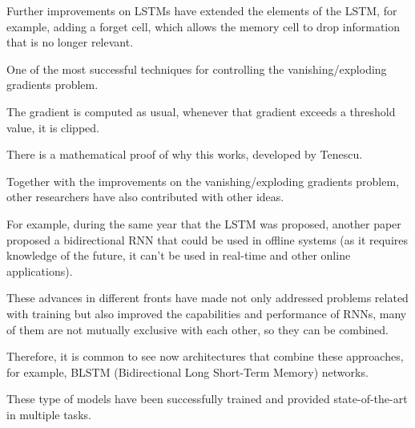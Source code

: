 Further improvements on LSTMs have extended the elements
of the LSTM, for example, adding a forget cell, which
allows the memory cell to drop information that is no
longer relevant.

 One of the most successful techniques for
controlling the vanishing/exploding gradients problem.

The gradient is computed as usual, whenever that gradient
exceeds a threshold value, it is clipped.

There is a mathematical proof of why this works, developed
by Tenescu.

 Together with the improvements on the
vanishing/exploding gradients problem, other researchers
have also contributed with other ideas.

For example, during the same year that the LSTM was
proposed, another paper proposed a bidirectional RNN that
could be used in offline systems (as it requires knowledge
of the future, it can’t be used in real-time and other
online applications).

These advances in different fronts have made not only
addressed problems related with training but also improved
the capabilities and performance of RNNs, many of them are
not mutually exclusive with each other, so they can be
combined.

Therefore, it is common to see now architectures that
combine these approaches, for example, BLSTM
(Bidirectional Long Short-Term Memory) networks.

These type of models have been successfully trained and
provided state-of-the-art in multiple tasks.
